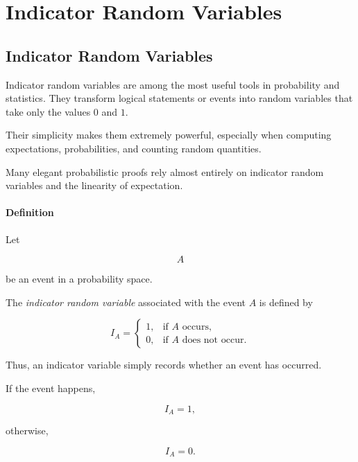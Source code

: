 \documentclass[11pt]{article}
\begin{document}
	\section{Indicator Random Variables}
	\begin{mdframed}[
		linewidth=0.8pt,
		roundcorner=6pt,
		backgroundcolor=gray!5,
		linecolor=gray!60,
		innertopmargin=10pt,
		innerbottommargin=10pt,
		innerleftmargin=10pt,
		innerrightmargin=10pt
		]
		
		\subsection*{Indicator Random Variables}
		
		Indicator random variables are among the most useful tools in probability and
		statistics. They transform logical statements or events into random
		variables that take only the values \(0\) and \(1\).
		
		Their simplicity makes them extremely powerful, especially when computing
		expectations, probabilities, and counting random quantities.
		
		Many elegant probabilistic proofs rely almost entirely on indicator random
		variables and the linearity of expectation.
		
		\bigskip
		
		\paragraph{Definition}
		
		Let
		
		\[
		A
		\]
		
		be an event in a probability space.
		
		The \emph{indicator random variable} associated with the event \(A\) is
		defined by
		
		\[
		\boxed{
			I_A=
			\begin{cases}
				1,&\text{if }A\text{ occurs},\\[0.2cm]
				0,&\text{if }A\text{ does not occur}.
			\end{cases}
		}
		\]
		
		Thus, an indicator variable simply records whether an event has occurred.
		
		If the event happens,
		
		\[
		I_A=1,
		\]
		
		otherwise,
		
		\[
		I_A=0.
		\]
		

\end{mdframed}
\end{document}
